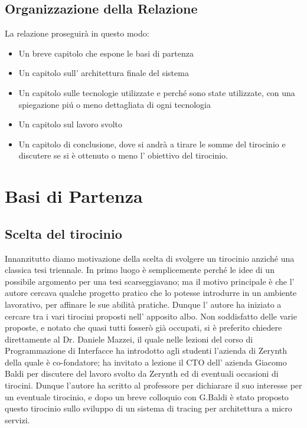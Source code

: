 \documentclass[a4paper,12pt,titlepage,italian,openany]{report}
\begin{document}
\section{Organizzazione della Relazione}
La relazione proseguirà in questo modo:
\begin{itemize}
    \item Un breve capitolo che espone le basi di partenza
    \item Un capitolo sull' architettura finale del sistema
    \item Un capitolo sulle tecnologie utilizzate e perché sono state utilizzate, con una spiegazione piú o meno dettagliata di ogni tecnologia
    \item Un capitolo sul lavoro svolto 
    \item Un capitolo di conclusione, dove si andrà a tirare le somme del tirocinio e discutere se si è ottenuto o meno l' obiettivo del tirocinio.
\end{itemize}



\chapter{Basi di Partenza}
\section{Scelta del tirocinio}
Innanzitutto diamo motivazione della scelta di svolgere un tirocinio anziché una classica tesi triennale. In primo luogo è semplicemente perché le idee di un possibile argomento
per una tesi scarseggiavano; ma il motivo principale è che l' autore cercava qualche progetto pratico che lo potesse introdurre in un ambiente lavorativo, per affinare le sue abilità pratiche. Dunque l' autore ha iniziato a cercare tra i vari tirocini proposti nell' apposito albo. Non soddisfatto delle varie proposte, e notato che quasi tutti fosserò già occupati, si è preferito chiedere direttamente al Dr. Daniele Mazzei, il quale nelle lezioni del corso di Programmazione di Interfacce ha introdotto agli studenti l'azienda di Zerynth della quale è co-fondatore; ha invitato a lezione 
il CTO dell' azienda Giacomo Baldi per discutere del lavoro svolto da Zerynth ed di eventuali occasioni di tirocini. Dunque l'autore ha scritto al professore per dichiarare il suo interesse per un eventuale tirocinio, e dopo un breve colloquio con G.Baldi è stato proposto questo tirocinio sullo sviluppo di un sistema di tracing per architettura a micro servizi.
\newpage
\end{document}
